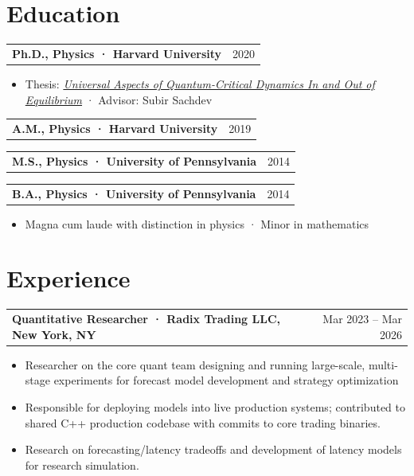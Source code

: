 \documentclass[11pt, letterpaper]{article}
\makeatletter
\newcommand{\entry}[2]{%
  \noindent
  \begin{tabularx}{\linewidth}{@{}X@{\hspace{4pt}}r@{}}
    \textbf{#1} & \textcolor{midgray}{\small #2}
  \end{tabularx}\vspace{1pt}%
}
\makeatother
\begin{document}
\section{Education}

\entry{Ph.D., Physics · Harvard University}{2020}
\begin{itemize}
  \item Thesis: \href{http://140.247.122.253/theses/Julia_Steinberg_thesis.pdf}{\textit{Universal Aspects of Quantum-Critical Dynamics In and Out of
        Equilibrium}} · Advisor: Subir Sachdev
\end{itemize}

\vspace{4pt}
\entry{A.M., Physics · Harvard University}{2019}

\vspace{4pt}
\entry{M.S., Physics · University of Pennsylvania}{2014}
\vspace{4pt}\entry{B.A., Physics · University of Pennsylvania}{2014}
\begin{itemize}
  \item Magna cum laude with distinction in physics · Minor in mathematics
\end{itemize}

\section{Experience}

\entry{Quantitative Researcher · Radix Trading LLC, New York, NY}{Mar 2023 – Mar 2026}
\begin{itemize}
  \item Researcher on the core quant team designing and running large-scale, multi-stage experiments for forecast model development and strategy optimization
  \item Responsible for deploying models into live production systems; contributed to
        shared C++ production codebase with commits to core
        trading binaries.
  \item Research on forecasting/latency tradeoffs and development of latency models for research simulation.
\end{itemize}
\end{document}
